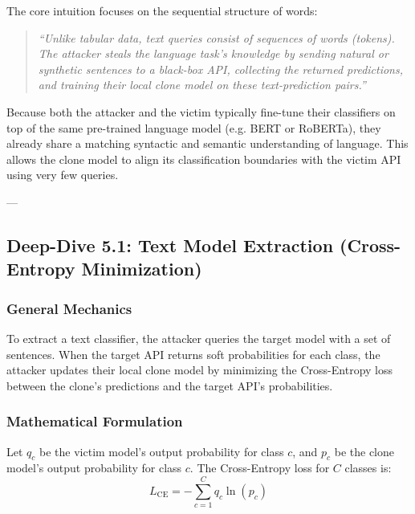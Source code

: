 \documentclass{article}
\begin{document}
The core intuition focuses on the sequential structure of words:
\begin{quote}
    \textit{``Unlike tabular data, text queries consist of sequences of words (tokens). The attacker steals the language task's knowledge by sending natural or synthetic sentences to a black-box API, collecting the returned predictions, and training their local clone model on these text-prediction pairs.''}
\end{quote}
Because both the attacker and the victim typically fine-tune their classifiers on top of the same pre-trained language model (e.g. BERT or RoBERTa), they already share a matching syntactic and semantic understanding of language. This allows the clone model to align its classification boundaries with the victim API using very few queries.

---

\subsection{Deep-Dive 5.1: Text Model Extraction (Cross-Entropy Minimization)}

\subsubsection{General Mechanics}
To extract a text classifier, the attacker queries the target model with a set of sentences. When the target API returns soft probabilities for each class, the attacker updates their local clone model by minimizing the Cross-Entropy loss between the clone's predictions and the target API's probabilities.

\subsubsection{Mathematical Formulation}
Let $q_c$ be the victim model's output probability for class $c$, and $p_c$ be the clone model's output probability for class $c$. The Cross-Entropy loss for $C$ classes is:
\begin{equation}
    L_{\text{CE}} = - \sum_{c=1}^C q_c \ln(p_c)
\end{equation}
\end{document}

